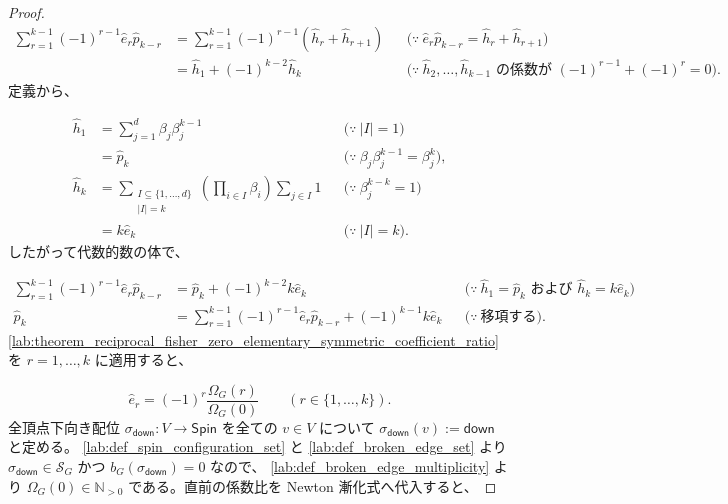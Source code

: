 \documentclass[11pt,a4paper]{article}
\theoremstyle{remark}
\begin{document}
\begin{proof}
\[\begin{aligned}
\sum_{r=1}^{k-1}(-1)^{r-1}\widehat e_r\widehat p_{k-r}
&=
\sum_{r=1}^{k-1}(-1)^{r-1}(\widehat h_r+\widehat h_{r+1})
&&\bigl(\because\ \widehat e_r\widehat p_{k-r}=\widehat h_r+\widehat h_{r+1}\bigr)\\
&=\widehat h_1+(-1)^{k-2}\widehat h_k
&&\bigl(\because\ \widehat h_2,\ldots,\widehat h_{k-1}\text{ の係数が }(-1)^{r-1}+(-1)^r=0\bigr).
\end{aligned}\]
定義から、

\[\begin{aligned}
\widehat h_1
&=\sum_{j=1}^{d}\beta_j\beta_j^{k-1}
&&\bigl(\because\ |I|=1\bigr)\\
&=\widehat p_k
&&\bigl(\because\ \beta_j\beta_j^{k-1}=\beta_j^k\bigr),\\
\widehat h_k
&=
\sum_{\substack{I\subseteq\{1,\ldots,d\}\\|I|=k}}
\left(
  \prod_{i\in I}\beta_i
\right)
\sum_{j\in I}1
&&\bigl(\because\ \beta_j^{k-k}=1\bigr)\\
&=k\widehat e_k
&&\bigl(\because\ |I|=k\bigr).
\end{aligned}\]
したがって代数的数の体で、

\[\begin{aligned}
\sum_{r=1}^{k-1}(-1)^{r-1}\widehat e_r\widehat p_{k-r}
&=\widehat p_k+(-1)^{k-2}k\widehat e_k
&&\bigl(\because\ \widehat h_1=\widehat p_k\text{ および }\widehat h_k=k\widehat e_k\bigr)\\
\widehat p_k
&=
\sum_{r=1}^{k-1}(-1)^{r-1}\widehat e_r\widehat p_{k-r}
+(-1)^{k-1}k\widehat e_k
&&\bigl(\because\ \text{移項する}\bigr).
\end{aligned}\]
\cref{lab:theorem_reciprocal_fisher_zero_elementary_symmetric_coefficient_ratio}
 を 
$r=1,\ldots,k$
 に適用すると、

\[\widehat e_r=(-1)^r\frac{\Omega_G(r)}{\Omega_G(0)}
\qquad(r\in\{1,\ldots,k\}).\]
全頂点下向き配位 
$\sigma_{\mathsf{down}}:V\to\mathsf{Spin}$
 を全ての 
$v\in V$
 について 
$\sigma_{\mathsf{down}}(v):=\mathsf{down}$
 と定める。
\cref{lab:def_spin_configuration_set}
 と 
\cref{lab:def_broken_edge_set}
 より 
$\sigma_{\mathsf{down}}\in\mathcal S_G$
 かつ 
$b_G(\sigma_{\mathsf{down}})=0$
 なので、
\cref{lab:def_broken_edge_multiplicity}
 より 
$\Omega_G(0)\in\mathbb N_{>0}$
 である。直前の係数比を Newton 漸化式へ代入すると、


\end{proof}
\end{document}
